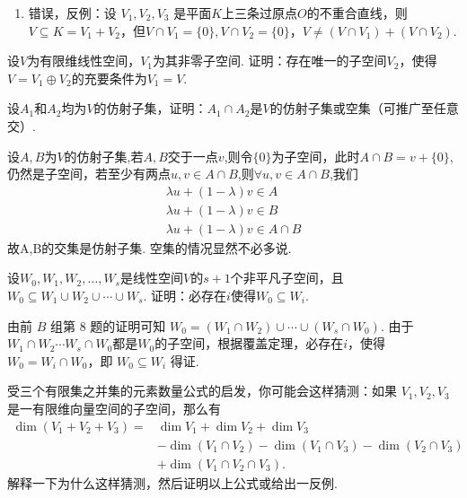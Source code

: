 \begin{exercise}
\begin{exgroup}
\begin{answer}
\begin{enumerate}
              \item 错误，反例：设 $V_1,V_2,V_3$ 是平面$K$上三条过原点$O$的不重合直线，则$V\subseteq K=V_1+V_2$，但$V\cap V_1=\{0\},V\cap V_2=\{0\}$，$V\ne (V\cap V_1)+(V\cap V_2)$.
          \end{enumerate}
        \end{answer}
        \item 设$V$为有限维线性空间，$V_1$为其非零子空间. 证明：存在唯一的子空间$V_2$，使得$V=V_1\oplus V_2$的充要条件为$V_1=V$.
        \begin{answer}

        \end{answer}

        \item 设$A_1$和$A_2$均为$V$的仿射子集，证明：$A_1\cap A_2$是$V$的仿射子集或空集（可推广至任意交）.
       \begin{answer}
        设$A,B$为$V$的仿射子集,若$A,B$交于一点$v$,则令$\{0\}$为子空间，此时$A \cap B = v+\{0\} $,仍然是子空间，若至少有两点$u,v \in A \cap B$,则$ \forall u,v \in A \cap B$,我们
        \begin{align*}
         \lambda u + (1-\lambda)v \in A \\
            \lambda u + (1-\lambda)v \in B\\
            \lambda u + (1-\lambda)v \in A \cap B
        \end{align*}
       故A,B的交集是仿射子集.
       空集的情况显然不必多说.
       \end{answer}
    \end{exgroup}

    \begin{exgroup}
        \item 设$W_0,W_1,W_2,\ldots,W_s$是线性空间$V$的$s+1$个非平凡子空间，且$W_0 \subseteq W_1 \cup W_2 \cup \cdots \cup W_s$. 证明：必存在$i$使得$W_0\subseteq W_i$.
        \begin{answer}
            由前 $B$ 组第 8 题的证明可知 $W_0=(W_1\cap W_2)\cup\cdots\cup(W_s\cap W_0)$. 由于$W_1\cap W_2\cdots W_s\cap W_0$都是$W_0$的子空间，根据覆盖定理，必存在$i$，使得$W_0=W_i\cap W_0$，即 $W_0\subseteq W_i$ 得证.
        \end{answer}

        \item 受三个有限集之并集的元素数量公式的启发，你可能会这样猜测：如果 $V_1,V_2,V_3$ 是一有限维向量空间的子空间，那么有
        \begin{align*}
            \dim(V_1+V_2+V_3) ={} &\dim V_1+\dim V_2+\dim V_3 \\
            &-\dim(V_1\cap V_2)-\dim(V_1\cap V_3)-\dim(V_2\cap V_3) \\
            &+\dim(V_1\cap V_2\cap V_3).
        \end{align*}
        解释一下为什么这样猜测，然后证明以上公式或给出一反例.
        \begin{answer}


\end{answer}
\end{exgroup}
\end{exercise}
